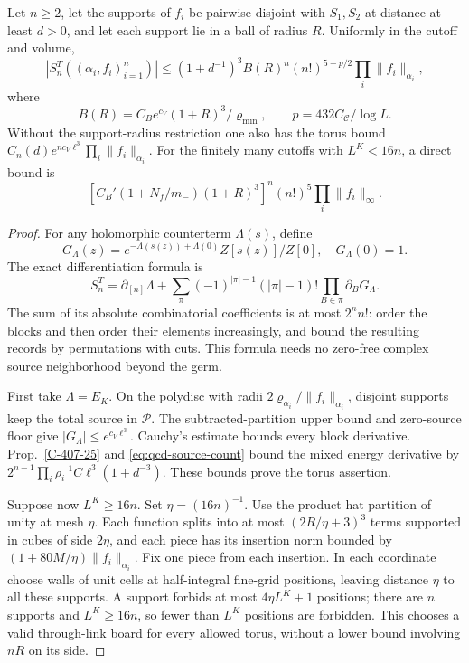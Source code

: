 \documentclass[11pt,letterpaper,reqno]{amsart}
\makeatletter
\theoremstyle{definition}
\newcommand{\ms@majorstart}{%
  \pushQED{\qed}\renewcommand{\qedsymbol}{$\blacksquare\square$}}
\newenvironment{theorem}[1][]{\ms@majorstart\ms@theorem[#1]}
  {\popQED\endms@theorem}
\theoremstyle{remark}
\makeatother
\begin{document}
\begin{theorem}[Separated cumulant bounds]\label{C-407-6}
Let $n\ge2$, let the supports of $f_i$ be pairwise
disjoint with $S_1,S_2$ at distance at least $d>0$, and
let each support lie in a ball of radius $R$.
Uniformly in the cutoff and volume,
\[
 |S_n^T((\alpha_i,f_i)_{i=1}^n)|
 \le (1+d^{-1})^3 B(R)^n(n!)^{5+p/2}
                         \prod_i\|f_i\|_{\alpha_i},
\]
where
\[
 B(R)=C_Be^{c_V}(1+R)^3/\varrho_{\min},\qquad
 p=432C_{\mathscr C}/\log L.
\]
Without the support-radius restriction one also has the
torus bound
$C_n(d)e^{nc_V\ell^3}\prod_i\|f_i\|_{\alpha_i}$.
For the finitely many cutoffs with $L^K<16n$, a direct bound is
\[
 [C_B'(1+N_f/m_-)(1+R)^3]^n(n!)^5
                                      \prod_i\|f_i\|_\infty.
\]
\end{theorem}
\begin{proof}
For any holomorphic counterterm $\Lambda(s)$, define
\[
 G_\Lambda(z)=e^{-\Lambda(s(z))+\Lambda(0)}Z[s(z)]/Z[0],
 \quad G_\Lambda(0)=1.
\]
The exact differentiation formula is
\[
 S_n^T=\partial_{[n]}\Lambda+
 \sum_\pi(-1)^{|\pi|-1}(|\pi|-1)!
                         \prod_{B\in\pi}\partial_BG_\Lambda.
\]
The sum of its absolute combinatorial coefficients is
at most $2^nn!$: order the blocks and then order their
elements increasingly, and bound the resulting records
by permutations with cuts. This formula needs no
zero-free complex source neighborhood beyond the germ.

First take $\Lambda=E_K$. On the polydisc with radii
$2\varrho_{\alpha_i}/\|f_i\|_{\alpha_i}$, disjoint
supports keep the total source in $\mathcal P$.
The subtracted-partition upper bound and zero-source
floor give $|G_\Lambda|\le e^{c_V\ell^3}$.
Cauchy's estimate bounds every block derivative.
Prop.~\ref{C-407-25} and
\eqref{eq:qcd-source-count} bound the mixed energy
derivative by $2^{n-1}\prod_i\rho_i^{-1}
C\ell^3(1+d^{-3})$. These bounds prove the torus assertion.

Suppose now $L^K\ge16n$. Set $\eta=(16n)^{-1}$.
Use the product hat partition of unity at mesh $\eta$.
Each function splits into at most $(2R/\eta+3)^3$
terms supported in cubes of side $2\eta$, and each
piece has its insertion norm bounded by
$(1+80M/\eta)\|f_i\|_{\alpha_i}$.
Fix one piece from each insertion. In each coordinate
choose walls of unit cells at half-integral fine-grid
positions, leaving distance $\eta$ to all these supports.
A support forbids at most $4\eta L^K+1$ positions;
there are $n$ supports and $L^K\ge16n$, so fewer than
$L^K$ positions are forbidden. This chooses a valid
through-link board for every allowed torus, without
a lower bound involving $nR$ on its side.


\end{proof}
\end{document}
